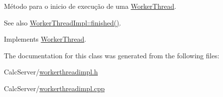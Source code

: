 Método para o inicio de execução de uma \hyperlink{classWorkerThread}{Worker\+Thread}. 

\begin{DoxySeeAlso}{See also}
\hyperlink{classWorkerThreadImpl_aca36cb83741dce52b5d92cc7a2844257}{Worker\+Thread\+Impl\+::finished()}. 
\end{DoxySeeAlso}


Implements \hyperlink{classWorkerThread_a4d6d532dfbb27c5a435018ea697acb11}{Worker\+Thread}.



The documentation for this class was generated from the following files\+:\begin{DoxyCompactItemize}
\item 
Calc\+Server/\hyperlink{workerthreadimpl_8h}{workerthreadimpl.\+h}\item 
Calc\+Server/\hyperlink{workerthreadimpl_8cpp}{workerthreadimpl.\+cpp}\end{DoxyCompactItemize}
